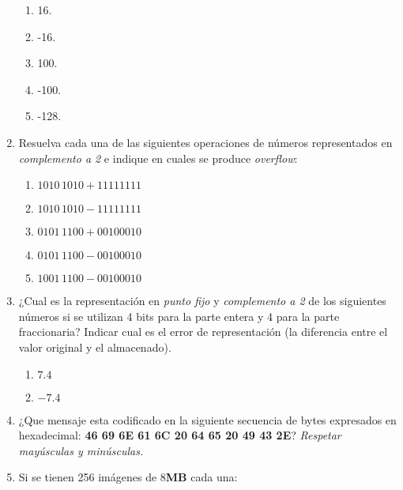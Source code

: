 \documentclass[12pt]{article}
\begin{document}
\begin{enumerate}
\begin{enumerate}
            \item 16.
            \item -16.
            \item 100.
            \item -100.
            \item -128.

        \end{enumerate}

    \item Resuelva cada una de las siguientes operaciones de números
    representados en \emph{complemento a 2} e indique en cuales se produce
    \emph{overflow}:

        \begin{enumerate}

            \item $1010\,1010 + 1111 1111$
            \item $1010\,1010 - 1111 1111$
            \item $0101\,1100 + 0010 0010$
            \item $0101\,1100 - 0010 0010$
            \item $1001\,1100 - 0010 0010$

        \end{enumerate}

    \item ¿Cual es la representación en \emph{punto fijo} y \emph{complemento
        a 2} de los siguientes números si se utilizan 4 bits para la parte
        entera y 4 para la parte fraccionaria? Indicar cual es el error de
        representación (la diferencia entre el valor original y el
        almacenado).

        \begin{enumerate}

            \item $7.4$

            \item $-7.4$

        \end{enumerate}

    \item ¿Que mensaje esta codificado en la siguiente secuencia de bytes
        expresados en hexadecimal: \textbf{46 69 6E 61 6C 20 64 65  20 49 43 2E}?
        \emph{Respetar mayúsculas y minúsculas.}

    \item Si se tienen 256 imágenes de 8\textbf{MB} cada una:


\end{enumerate}
\end{document}
